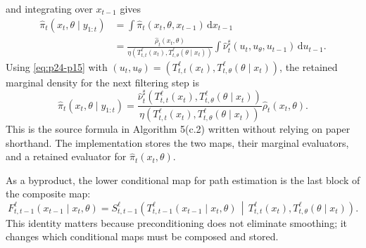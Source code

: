 \documentclass[11pt]{article}
\newcommand{\dd}{\,\mathrm d}
\begin{document}
and integrating over
\(x_{t-1}\) gives
\[
\begin{aligned}
 \widehat\pi_t(x_t,\theta\mid y_{1:t})
 &=
 \int \widehat\pi_t(x_t,\theta,x_{t-1})\dd x_{t-1}\\
 &=
 \frac{\widehat\rho_t(x_t,\theta)}
 {\eta(T_{t,t}^{\ell}(x_t),T_{t,\theta}^{\ell}(\theta\mid x_t))}
 \int \widehat\nu_t^\sharp(u_t,u_\theta,u_{t-1})\dd u_{t-1}.
\end{aligned}
    \label{eq:p24-p16d}
\]
Using \eqref{eq:p24-p15} with
\((u_t,u_\theta)=
(T_{t,t}^{\ell}(x_t),T_{t,\theta}^{\ell}(\theta\mid x_t))\), the retained
marginal density for the next filtering step is
\[
    \widehat\pi_t(x_t,\theta\mid y_{1:t})
    =
    \frac{
    \widehat\nu_t^\sharp\!\left(
    T_{t,t}^{\ell}(x_t),
    T_{t,\theta}^{\ell}(\theta\mid x_t)
    \right)}
    {
    \eta\!\left(
    T_{t,t}^{\ell}(x_t),
    T_{t,\theta}^{\ell}(\theta\mid x_t)
    \right)}
    \widehat\rho_t(x_t,\theta).
    \label{eq:p24-p17}
\]
This is the source formula in Algorithm 5(c.2) written without relying on
paper shorthand.  The implementation stores the two maps, their marginal
evaluators, and a retained evaluator for \(\widehat\pi_t(x_t,\theta)\).

As a byproduct, the lower conditional map for path estimation is the last block
of the composite map:
\[
    F_{t,t-1}^{\ell}(x_{t-1}\mid x_t,\theta)
    =
    S_{t,t-1}^{\ell}
    \!\left(
    T_{t,t-1}^{\ell}(x_{t-1}\mid x_t,\theta)
    \,\middle|\,
    T_{t,t}^{\ell}(x_t),
    T_{t,\theta}^{\ell}(\theta\mid x_t)
    \right).
    \label{eq:p24-p18}
\]
This identity matters because preconditioning does not eliminate smoothing; it
changes which conditional maps must be composed and stored.

\begin{center}
\end{center}
\end{document}
